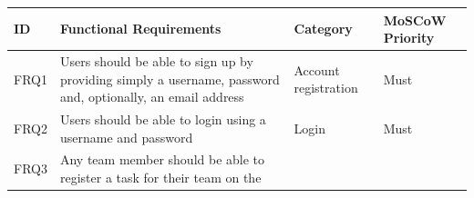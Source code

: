\begin{longtable}[]{@{}llll@{}}
\toprule
\begin{minipage}[b]{0.04\columnwidth}\raggedright\strut
ID\strut
\end{minipage} & \begin{minipage}[b]{0.64\columnwidth}\raggedright\strut
Functional Requirements\strut
\end{minipage} & \begin{minipage}[b]{0.12\columnwidth}\raggedright\strut
Category\strut
\end{minipage} & \begin{minipage}[b]{0.09\columnwidth}\raggedright\strut
MoSCoW Priority\strut
\end{minipage}\tabularnewline
\midrule
\endhead
\begin{minipage}[t]{0.04\columnwidth}\raggedright\strut
FRQ1\strut
\end{minipage} & \begin{minipage}[t]{0.64\columnwidth}\raggedright\strut
Users should be able to sign up by providing simply a username, password
and, optionally, an email address\strut
\end{minipage} & \begin{minipage}[t]{0.12\columnwidth}\raggedright\strut
Account registration\strut
\end{minipage} & \begin{minipage}[t]{0.09\columnwidth}\raggedright\strut
Must\strut
\end{minipage}\tabularnewline
\begin{minipage}[t]{0.04\columnwidth}\raggedright\strut
FRQ2\strut
\end{minipage} & \begin{minipage}[t]{0.64\columnwidth}\raggedright\strut
Users should be able to login using a username and password\strut
\end{minipage} & \begin{minipage}[t]{0.12\columnwidth}\raggedright\strut
Login\strut
\end{minipage} & \begin{minipage}[t]{0.09\columnwidth}\raggedright\strut
Must\strut
\end{minipage}\tabularnewline
\begin{minipage}[t]{0.04\columnwidth}\raggedright\strut
FRQ3\strut
\end{minipage} & \begin{minipage}[t]{0.64\columnwidth}\raggedright\strut
Any team member should be able to register a task for their team on the

\end{minipage}
\end{longtable}
